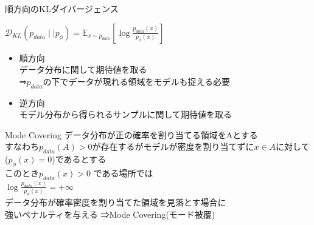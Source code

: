 \begin{frame}{順方向のKLダイバージェンス}
    \small
    \begin{block}{}
    \centering$\mathcal{D}_{KL}(p_{data}\mid\mid p_{\phi})=\mathbb{E}_{x\sim p_{data}}[\log \frac{p_{data}(x)}{p_{\phi}(x)}]$

        \begin{itemize}
            \item 順方向\\
            データ分布に関して期待値を取る\\
            ⇒$p_{data}$の下でデータが現れる領域をモデルも捉える必要
            \item 逆方向\\
            モデル分布から得られるサンプルに関して期待値を取る
        \end{itemize}

        \begin{alertblock}{Mode Covering}
            データ分布が正の確率を割り当てる領域をAとする\\
            すなわち$p_{data}(A)>0$が存在するがモデルが密度を割り当てずに$x\in A$に対して($p_{\phi}(x)=0$)であるとする\\
            このとき$p_{data}(x)>0$ である場所では\\
            \centering$\log \frac{p_{data}(x)}{p_{\phi}(x)}=+\infty$\\

            データ分布が確率密度を割り当てた領域を見落とす場合に\\強いペナルティを与える
            ⇒Mode Covering(モード被覆)
        \end{alertblock}
    \end{block}
\end{frame}
